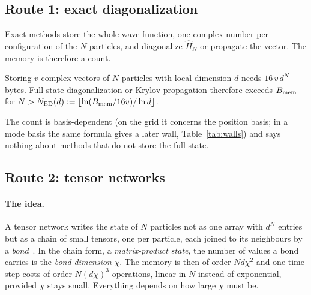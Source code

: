\subsection{Route 1: exact diagonalization}

Exact methods store the whole wave function, one complex number per configuration of the $N$ particles, and diagonalize $\hat H_N$ or propagate the vector. The memory is therefore a count.

\begin{prop}\label{prop:ed}\stE{}
Storing $v$ complex vectors of $N$ particles with local dimension $d$ needs $16\,v\,d^N$ bytes. Full-state diagonalization or Krylov propagation therefore exceeds $B_{\mathrm{mem}}$ for
$N>N_{\mathrm{ED}}(d):=\lfloor\ln(B_{\mathrm{mem}}/16v)/\ln d\rfloor$.
\end{prop}
The count is basis-dependent (on the grid it concerns the position basis; in a mode basis the same formula gives a later wall, Table~\ref{tab:walls}) and says nothing about methods that do not store the full state.

\subsection{Route 2: tensor networks}
\label{sec:fw-tn}

\paragraph{The idea.}
A tensor network writes the state of $N$ particles not as one array with $d^N$ entries but as a chain of small tensors, one per particle, each joined to its neighbours by a \emph{bond}~\cite{white1992,vidal2004,schollwock2011,paeckel2019}. In the chain form, a \emph{matrix-product state}, the number of
values a bond carries is the \emph{bond dimension} $\chi$. The memory is then of order $N d\chi^2$ and one time step costs of order $N(d\chi)^3$ operations, linear in $N$ instead of exponential, provided $\chi$ stays small. Everything depends on how large $\chi$ must be.

